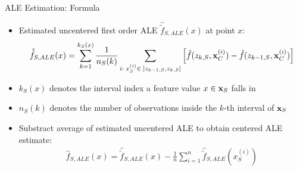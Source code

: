 \documentclass[11pt,compress,t,notes=noshow, aspectratio=169, xcolor=table]{beamer}
\begin{document}
%
%
%
%
%
%
%
%
%
%
%
%
%
%
%
%
%
%
%
%

\begin{frame}{ALE Estimation: Formula}

\begin{itemize}
\item Estimated uncentered first order ALE $\hat{\tilde{f}}_{S, ALE}(x)$ at point $x$:
$$
\begin{aligned}
\hat{\tilde{f}}_{S, ALE}(x) = \sum_{k = 1}^{k_S(x)}\frac{1}{n_S(k)}\sum_{i: \; x_S^{(i)} \in \; ]z_{k-1, S}, z_{k, S}]}\left[\fh(z_{k, S}, \xi_C) -\fh(z_{k-1, S}, \xi_C)\right]
\end{aligned}
$$
\item $k_S(x)$ denotes the interval index a feature value $x \in \xv_S$ falls in
\item $n_S(k)$ denotes the number of observations inside the $k$-th interval of $\xv_S$
\item Substract average of estimated uncentered ALE to obtain centered ALE estimate: %
$$
\begin{aligned}
\hat{f}_{S, ALE}(x) = \hat{\tilde{f}}_{S, ALE}(x) - \frac{1}{n}\sum_{i = 1}^n \hat{\tilde{f}}_{S, ALE}(x_S^{(i)})
\end{aligned}
$$

\end{itemize}
\end{frame}
\end{document}

